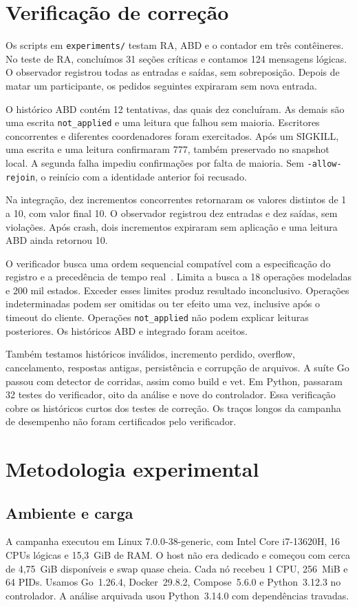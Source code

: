 \documentclass[conference]{IEEEtran}
\begin{document}
\section{Verificação de correção}
Os scripts em \texttt{experiments/} testam RA, ABD e o contador em três contêineres. No teste de RA, concluímos 31 seções críticas e contamos 124 mensagens lógicas. O observador registrou todas as entradas e saídas, sem sobreposição. Depois de matar um participante, os pedidos seguintes expiraram sem nova entrada.

O histórico ABD contém 12 tentativas, das quais dez concluíram. As demais são uma escrita \texttt{not\_applied} e uma leitura que falhou sem maioria. Escritores concorrentes e diferentes coordenadores foram exercitados. Após um SIGKILL, uma escrita e uma leitura confirmaram 777, também preservado no snapshot local. A segunda falha impediu confirmações por falta de maioria. Sem \texttt{-allow-rejoin}, o reinício com a identidade anterior foi recusado.

Na integração, dez incrementos concorrentes retornaram os valores distintos de 1 a 10, com valor final 10. O observador registrou dez entradas e dez saídas, sem violações. Após crash, dois incrementos expiraram sem aplicação e uma leitura ABD ainda retornou 10.

O verificador busca uma ordem sequencial compatível com a especificação do registro e a precedência de tempo real~\cite{linearizability}. Limita a busca a 18 operações modeladas e 200 mil estados. Exceder esses limites produz resultado inconclusivo. Operações indeterminadas podem ser omitidas ou ter efeito uma vez, inclusive após o timeout do cliente. Operações \texttt{not\_applied} não podem explicar leituras posteriores. Os históricos ABD e integrado foram aceitos.

Também testamos históricos inválidos, incremento perdido, overflow, cancelamento, respostas antigas, persistência e corrupção de arquivos. A suíte Go passou com detector de corridas, assim como build e vet. Em Python, passaram 32 testes do verificador, oito da análise e nove do controlador. Essa verificação cobre os históricos curtos dos testes de correção. Os traços longos da campanha de desempenho não foram certificados pelo verificador.

\section{Metodologia experimental}
\subsection{Ambiente e carga}
A campanha  executou em Linux 7.0.0-38-generic, com Intel Core i7-13620H, 16 CPUs lógicas e 15,3~GiB de RAM. O host não era dedicado e começou com cerca de 4,75~GiB disponíveis e swap quase cheia. Cada nó recebeu 1 CPU, 256~MiB e 64 PIDs. Usamos Go~1.26.4, Docker~29.8.2, Compose~5.6.0 e Python~3.12.3 no controlador. A análise arquivada usou Python~3.14.0 com dependências travadas.
\end{document}
